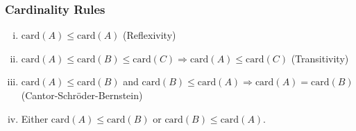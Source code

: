 \documentclass[10pt]{extarticle}
\begin{document}
      \subsubsection{Cardinality Rules}%
      \begin{enumerate}[(i)]
        \item $\text{card}(A) \leq \text{card}(A)$ (Reflexivity)
        \item $\text{card}(A)\leq \text{card}(B) \leq \text{card}(C)\Rightarrow \text{card}(A) \leq \text{card}(C)$ (Transitivity)
        \item $\text{card}(A) \leq \text{card}(B)$ and $\text{card}(B) \leq \text{card}(A) \Rightarrow \text{card}(A) = \text{card}(B)$ (Cantor-Schröder-Bernstein)
        \item Either $\text{card}(A) \leq \text{card}(B)$ or $\text{card}(B) \leq \text{card}(A)$.
      \end{enumerate}
\end{document}
